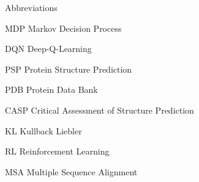 
\begin{dictionary}{Abbreviations}
\item[MDP]  Markov Decision Process
\item[DQN]  Deep-Q-Learning
\item[PSP]  Protein Structure Prediction
\item[PDB]  Protein Data Bank
\item[CASP] Critical Assessment of Structure Prediction
\item[KL]   Kullback Liebler
\item[RL]   Reinforcement Learning
\item[MSA]  Multiple Sequence Alignment
\end{dictionary}
